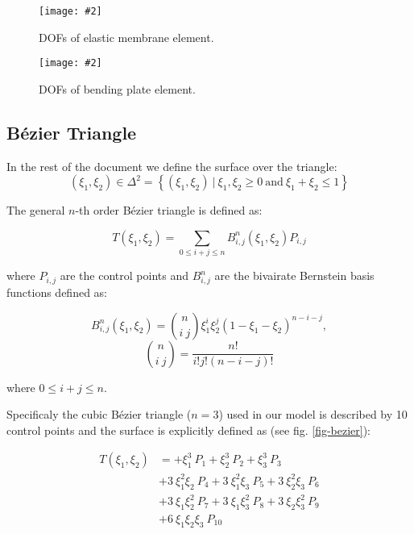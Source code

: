 \documentclass{egpubl}
\newcommand{\Figure}[3]{%
\begin{figure}[htb]
  \centering
  \texttt{[image: \#2]}
  \caption{\label{fig-#2}#3}
\end{figure}}
\begin{document}
\Figure{0.8\linewidth}{membrane}
{DOFs of elastic membrane element.}

\Figure{0.8\linewidth}{plate}
{DOFs of bending plate element.}

\subsection{Bézier Triangle} %

In the rest of the document we define the surface over the triangle:
\begin{equation}
    (\xi_1,\xi_2) \in \Delta^2 = \left\{ (\xi_1,\xi_2)~|~\xi_1, \xi_2 \ge 0
        \mathrm{~and~} \xi_1+\xi_2 \le 1 \right\}
\end{equation}

The general $n$-th order Bézier triangle is defined as:

\begin{equation}
    T(\xi_1, \xi_2) = \sum_{0 \le i + j \le n} B^n_{i,j}(\xi_1,\xi_2) P_{i,j}
\end{equation}

where $P_{i,j}$ are the control points and $B^n_{i,j}$ are the bivairate
Bernstein basis functions defined as:

\begin{equation}
  B^n_{i,j} (\xi_1,\xi_2) =
    \binom{n}{i~j} \xi_1^i \xi_2^j (1-\xi_1-\xi_2)^{n-i-j},
\end{equation}
\begin{equation}
  \binom{n}{i~j} = \frac{n!}{i!j!(n-i-j)!}
\end{equation}

where $ 0 \le i+j \le n $.

Specificaly the cubic Bézier triangle ($n=3$) used in our model is
described by 10 control points and the surface is explicitly defined as (see
fig. \ref{fig-bezier}):

\begin{equation}\label{eq-cubicbez}
  \begin{split}
  T(\xi_1,\xi_2) & =
           + \xi_1^3\ P_1
           + \xi_2^3\ P_2
           + \xi_3^3\ P_3 \\
         & + 3\ \xi_1^2 \xi_2\ P_4
           + 3\ \xi_1^2 \xi_3\ P_5
           + 3\ \xi_2^2 \xi_3\ P_6 \\
         & + 3\ \xi_1 \xi_2^2\ P_7
           + 3\ \xi_1 \xi_3^2\ P_8
           + 3\ \xi_2 \xi_3^2\ P_9 \\
         & + 6\ \xi_1 \xi_2 \xi_3\ P_{10} \\
  \end{split}
\end{equation}
\end{document}
